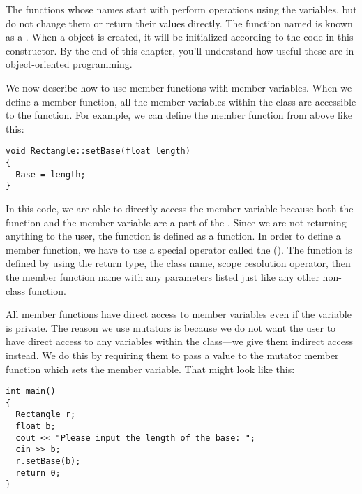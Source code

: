 The functions whose names start with  perform operations using the variables, but do not change them or return their values directly.
The function named  is known as a . 
When a  object is created, it will be initialized according to the code in this constructor. 
By the end of this chapter, you'll understand how useful these are in object-oriented programming.
	

We now describe how to use member functions with  member variables. 
When we define a member function, all the member variables within the class are accessible to the function. 
For example, we can define the member function  from  above like this:

\noindent\begin{minipage}{\linewidth}\begin{lstlisting}
void Rectangle::setBase(float length)
{
  Base = length;
}
\end{lstlisting}\end{minipage}

In this code, we are able to directly access the member variable  because both the function  and the member variable  are a part of the . 
Since we are not returning anything to the user, the function is defined as a  function. 
In order to define a member function, we have to use a special operator called the  (\Code{::}). 
The function is defined by using the return type, the class name, scope resolution operator, then the member function name with any parameters listed just like any other non-class function.	


All member functions have direct access to member variables even if the variable is private. 
The reason we use mutators is because we do not want the user to have direct access to any variables within the class---we give them indirect access instead. 
We do this by requiring them to pass a value to the mutator member function which sets the member variable. 
That might look like this: 

\noindent\begin{minipage}{\linewidth}\begin{lstlisting}
int main()
{
  Rectangle r;
  float b;
  cout << "Please input the length of the base: ";
  cin >> b;
  r.setBase(b);
  return 0;
}
\end{lstlisting}\end{minipage}

